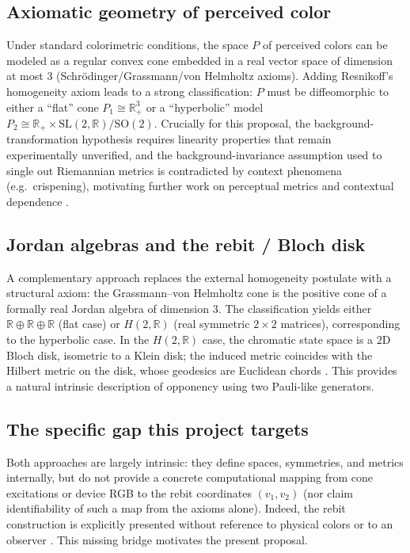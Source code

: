 \documentclass[11pt]{article}
\newcommand{\R}{\mathbb{R}}
\newcommand{\Rp}{\R_{+}}
\begin{document}
\subsection{Axiomatic geometry of perceived color}
Under standard colorimetric conditions, the space $P$ of perceived colors can be modeled as a regular convex cone embedded in a real vector space of dimension at most $3$ (Schr\"odinger/Grassmann/von Helmholtz axioms).
Adding Resnikoff's homogeneity axiom leads to a strong classification: $P$ must be diffeomorphic to either a ``flat'' cone $P_1 \cong \Rp^3$ or a ``hyperbolic'' model $P_2 \cong \Rp \times \mathrm{SL}(2,\R)/\mathrm{SO}(2)$.
Crucially for this proposal, the background-transformation hypothesis requires linearity properties that remain experimentally unverified, and the background-invariance assumption used to single out Riemannian metrics is contradicted by context phenomena (e.g.\ crispening), motivating further work on perceptual metrics and contextual dependence \cite{Provenzi2020}.

\subsection{Jordan algebras and the rebit / Bloch disk}
A complementary approach replaces the external homogeneity postulate with a structural axiom:
the Grassmann--von Helmholtz cone is the positive cone of a formally real Jordan algebra of dimension $3$.
The classification yields either $\R\oplus\R\oplus\R$ (flat case) or $H(2,\R)$ (real symmetric $2\times2$ matrices), corresponding to the hyperbolic case.
In the $H(2,\R)$ case, the chromatic state space is a 2D Bloch disk, isometric to a Klein disk; the induced metric coincides with the Hilbert metric on the disk, whose geodesics are Euclidean chords \cite{Berthier2020}.
This provides a natural intrinsic description of opponency using two Pauli-like generators.

\subsection{The specific gap this project targets}
Both approaches are largely intrinsic:
they define spaces, symmetries, and metrics internally, but do not provide a concrete computational mapping from cone excitations or device RGB to the rebit coordinates $(v_1,v_2)$ (nor claim identifiability of such a map from the axioms alone).
Indeed, the rebit construction is explicitly presented without reference to physical colors or to an observer \cite{Berthier2020}.
This missing bridge motivates the present proposal.
\end{document}
